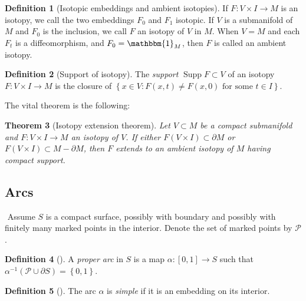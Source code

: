 \documentclass[reqno]{amsart}
\newtheorem{theorem}{Theorem}[section]
\theoremstyle{definition}
\newtheorem{definition}[theorem]{Definition}
\theoremstyle{remark}
\DeclareMathOperator{\Supp}{Supp}
\begin{document}
\begin{definition}[Isotopic embeddings and ambient isotopies]
    If $F \colon V \times I \to M$ is an isotopy, we call
    the two embeddings $F_0$ and $F_1$ 
    isotopic. If $V$ is a submanifold of $M$ and
    $F_0$ is the inclusion, we call $F$ an isotopy
    of $V$ in $M$.
    When $V = M$ and each $F_t$ is a diffeomorphism, and
    $F_0 = \mathbbm{1}_M$, then $F$ is called
    an ambient isotopy.
\end{definition}

\begin{definition}[Support of isotopy]
    The \textit{support} $\Supp F
    \subset V $ of an isotopy $F \colon V \times I \to M$ 
    is the closure of
    $\left\{ x \in V \colon
    F(x,t) \neq F(x,0) \text{ for some }
t \in I\right\} $.
\end{definition}

The vital theorem is the following:

\begin{theorem}[Isotopy extension theorem]\label{isotopy-extension}
    \cite[Theorem 1.3, chapter 8]{Hirsch}
    Let $V \subset M$ be a compact submanifold
    and $F \colon V \times I \to M$ an isotopy
    of $V$. If either $F\left( V \times I \right) 
    \subset \partial M$ or $F\left( V \times I \right) 
    \subset M - \partial M$, then $F$ extends to
    an ambient isotopy of $M$ having compact support.
\end{theorem}




\subsection{Arcs}
$ $ \newline \newline
Assume $S$ is a compact surface, possibly with boundary
and possibly with finitely many marked points in the interior.
Denote the set of marked points by $\mathcal{P}$.

\begin{definition}[]
    A \textit{proper arc} in $S$ is a map $\alpha \colon
    \left[ 0,1 \right]  \to S$ such that
    $\alpha^{-1} \left( \mathcal{P} \cup \partial S \right) 
    = \left\{ 0,1 \right\} $.
\end{definition}
\begin{definition}[]
    The arc $\alpha$ is \textit{simple} if it is an embedding
on its interior.
\end{definition}
\end{document}

